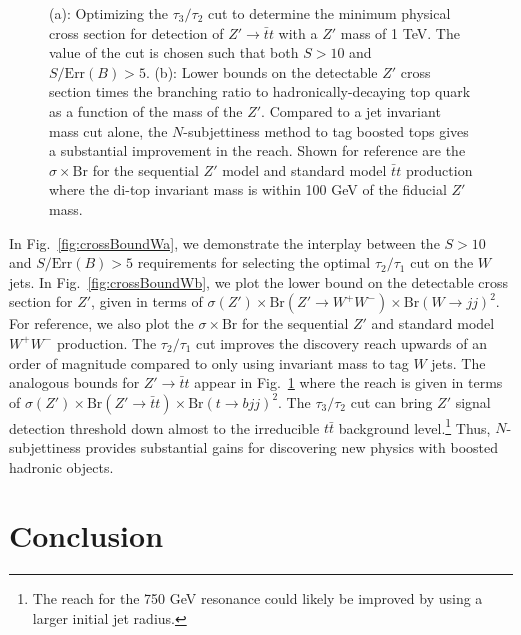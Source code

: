 \documentclass{JHEP3}
\newcommand{\vsh}{\vspace{-.5cm}}
\DeclareRobustCommand{\Fig}[1]{Fig.~\ref{#1}}
\begin{document}
\begin{figure}[tp]
  \begin{center}
  \end{center}
\vsh
    \caption{(a): Optimizing the $\tau_3/\tau_2$ cut to determine the minimum physical cross section for detection of $Z' \rightarrow \bar{t} t$ with a $Z'$ mass of 1 TeV.  The value of the cut is chosen such that both $S > 10$ and $S/\text{Err}(B) > 5$.  (b): Lower bounds on the detectable $Z'$ cross section times the branching ratio to hadronically-decaying top quark as a function of the mass of the $Z'$.  Compared to a jet invariant mass cut alone, the $N$-subjettiness method to tag boosted tops gives a substantial improvement in the reach.  Shown for reference are the $\sigma \times \text{Br}$ for the sequential $Z'$ model and standard model $\bar{t}t$ production where the di-top invariant mass is within 100 GeV of the fiducial $Z'$ mass.}
    \label{fig:crossBound}
\end{figure}

In \Fig{fig:crossBoundWa}, we demonstrate the interplay between the $S > 10$ and $S/\text{Err}(B) > 5$ requirements for selecting the optimal $\tau_2/\tau_1$ cut on the $W$ jets.  In \Fig{fig:crossBoundWb}, we plot the lower bound on the detectable cross section for $Z'$, given in terms of $\sigma(Z') \times \text{Br}(Z' \rightarrow W^+ W^-) \times \text{Br}(W \rightarrow jj)^2$.  For reference, we also plot the $\sigma \times \text{Br}$ for the sequential $Z'$ and standard model $W^+ W^-$ production.  The $\tau_2/\tau_1$ cut improves the discovery reach upwards of an order of magnitude compared to only using invariant mass to tag $W$ jets.  The analogous bounds for $Z' \rightarrow \bar{t}t$ appear in \Fig{fig:crossBound} where the reach is given in terms of $\sigma(Z') \times \text{Br}(Z' \rightarrow \bar{t}t) \times \text{Br}(t \rightarrow bjj)^2$. 
The $\tau_3/\tau_2$ cut can bring $Z'$ signal detection threshold down almost to the irreducible $t\bar{t}$ background level.\footnote{The reach for the 750 GeV resonance could likely be improved by using a larger initial jet radius.}  Thus, $N$-subjettiness provides substantial gains for discovering new physics with boosted hadronic objects.

\section{Conclusion}
\label{sec:conclusions}
\end{document}
